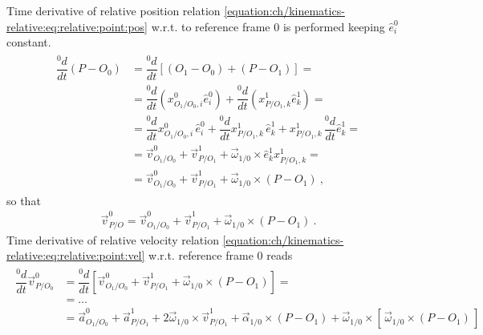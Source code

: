 \documentclass[letterpaper,10pt,english]{jupyterBook}
\begin{document}
\sphinxAtStartPar
{} Time derivative of relative position relation \eqref{equation:ch/kinematics-relative:eq:relative:point:pos} w.r.t. to reference frame \(0\) is performed keeping \(\hat{e}^0_i\) constant.
\begin{equation*}
\begin{split}\begin{aligned}
  \dfrac{{}^0 d}{dt} (P-O_0)
  & = \dfrac{{}^0 d}{dt} \left[ (O_1 - O_0) + (P - O_1) \right] = \\
  & = \dfrac{{}^0 d}{dt} \left( x^0_{O_1/O_0,i} \hat{e}^0_i  \right) + \dfrac{{}^0 d}{dt} \left( x^1_{P/O_1,k} \hat{e}^1_k \right) = \\
  & = \dfrac{{}^0 d}{dt} x^0_{O_1/O_0,i} \, \hat{e}^0_i + \dfrac{{}^0 d}{dt} x^1_{P/O_1,k} \, \hat{e}^1_k + x^1_{P/O_1,k} \, \dfrac{{}^0 d}{dt}  \hat{e}^1_k = \\
  & = \vec{v}^0_{O_1/O_0} + \vec{v}^1_{P/O_1} + \vec{\omega}_{1/0} \times  \hat{e}^1_k x^1_{P/O_1,k} = \\
  & = \vec{v}^0_{O_1/O_0} + \vec{v}^1_{P/O_1} + \vec{\omega}_{1/0} \times ( P - O_1 )  \ ,
\end{aligned}\end{split}
\end{equation*}
\sphinxAtStartPar
so that
\begin{equation}\label{equation:ch/kinematics-relative:eq:relative:point:vel}
\begin{split} \vec{v}^0_{P/O} = \vec{v}^0_{O_1/O_0} + \vec{v}^1_{P/O_1} + \vec{\omega}_{1/0} \times ( P - O_1 )  \ .\end{split}
\end{equation}
\sphinxAtStartPar
{} Time derivative of relative velocity relation \eqref{equation:ch/kinematics-relative:eq:relative:point:vel} w.r.t. reference frame \(0\) reads
\begin{equation*}
\begin{split}\begin{aligned}
  \dfrac{{}^0 d}{dt} \vec{v}^0_{P/O_0}
  & = \dfrac{{}^0 d}{dt} \left[ \vec{v}^0_{O_1/O_0} + \vec{v}^1_{P/O_1} + \vec{\omega}_{1/0} \times ( P - O_1 ) \right] = \\
  & = \dots \\
  & = \vec{a}^0_{O_1/O_0} + \vec{a}^{1}_{P/O_1} + 2 \vec{\omega}_{1/0} \times \vec{v}^1_{P/O_1} + \vec{\alpha}_{1/0} \times (P - O_1) + \vec{\omega}_{1/0} \times [ \, \vec{\omega}_{1/0} \times (P - O_1) \, ]
\end{aligned}\end{split}
\end{equation*}
\end{document}
